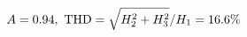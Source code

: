 \documentclass[preview]{standalone}
\begin{document}
\begin{align*}
\special{dvisvgm:raw <g id='unique000'>}A=0.94,\ \text{THD}=\sqrt{H_2^2+H_3^2}/H_1=16.6\%\special{dvisvgm:raw </g>}
\end{align*}
\end{document}
